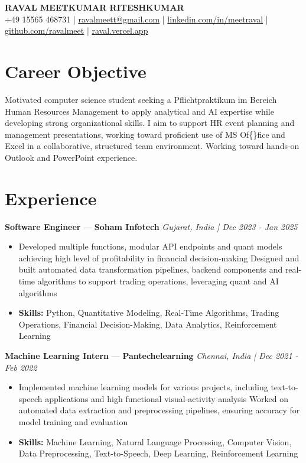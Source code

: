 \documentclass[a4paper,10pt]{article}
\begin{document}
\begin{center}
  {\Large\bfseries RAVAL MEETKUMAR RITESHKUMAR}\\[2pt]
  {\small +49 15565 468731 \;|\; \href{mailto:ravalmeett@gmail.com}{ravalmeett@gmail.com} \;|\; \href{https://www.linkedin.com/in/meetraval/}{linkedin.com/in/meetraval} \;|\; \href{https://github.com/ravalmeet}{github.com/ravalmeet} \;|\; \href{https://raval.vercel.app/}{raval.vercel.app}}
\end{center}
\vspace{-3pt}

\section*{Career Objective}
Motivated computer science student seeking a Pflichtpraktikum im Bereich Human Resources Management to apply analytical and AI expertise while developing strong organizational skills. I aim to support HR event planning and management presentations, working toward proficient use of MS Of\{\}fice and Excel in a collaborative, structured team environment. Working toward hands-on Outlook and PowerPoint experience.\par

\section*{Experience}
\textbf{Software Engineer} — \textbf{Soham Infotech} \hfill \textit{Gujarat, India \;|\; Dec 2023 - Jan 2025}\par
\vspace{1pt}
\begin{itemize}
  \item Developed multiple functions, modular API endpoints and quant models achieving high level of profitability in financial decision-making Designed and built automated data transformation pipelines, backend components and real-time algorithms to support trading operations, leveraging quant and AI algorithms
  \item \textbf{Skills:} Python, Quantitative Modeling, Real-Time Algorithms, Trading Operations, Financial Decision-Making, Data Analytics, Reinforcement Learning
\end{itemize}
\vspace{3pt}
\textbf{Machine Learning Intern} — \textbf{Pantechelearning} \hfill \textit{Chennai, India \;|\; Dec 2021 - Feb 2022}\par
\vspace{1pt}
\begin{itemize}
  \item Implemented machine learning models for various projects, including text-to-speech applications and high functional visual-activity analysis Worked on automated data extraction and preprocessing pipelines, ensuring accuracy for model training and evaluation
  \item \textbf{Skills:} Machine Learning, Natural Language Processing, Computer Vision, Data Preprocessing, Text-to-Speech, Deep Learning, Reinforcement Learning
\end{itemize}
\end{document}
